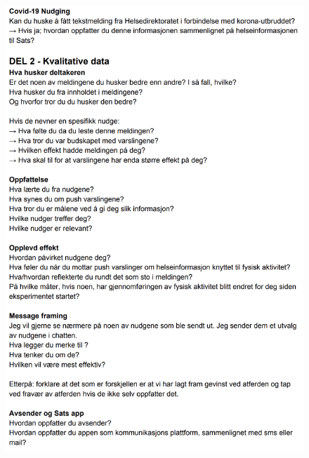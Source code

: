\begin{figure}
    \centering
    \includegraphics[width=1\textwidth]{images/IG2.png}
\end{figure}
\label{guide}